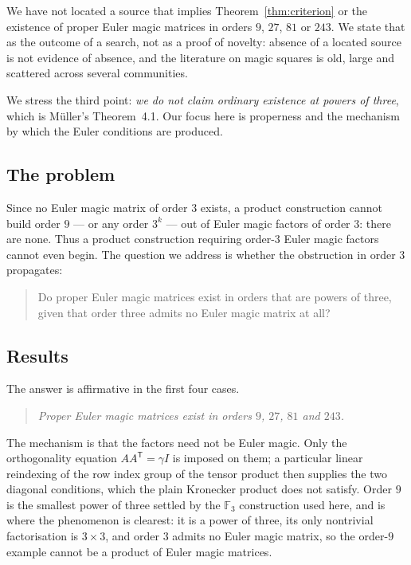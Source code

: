 \documentclass[11pt,a4paper]{amsart}
\theoremstyle{plain}
\theoremstyle{definition}
\theoremstyle{remark}
\newcommand{\FF}{\mathbb{F}}
\newcommand{\tr}{\mathsf{T}}
\begin{document}
We have not located a source that implies Theorem~\ref{thm:criterion} or the
existence of proper Euler magic matrices in orders $9$, $27$, $81$ or $243$. We
state that as the outcome of a search, not as a proof of novelty: absence of a
located source is not evidence of absence, and the literature on magic squares
is old, large and scattered across several communities.

We stress the third point: \emph{we do not claim ordinary existence at powers of
three}, which is Müller's Theorem~4.1. Our focus here is properness and the
mechanism by which the Euler conditions are produced.

\subsection*{The problem}

Since no Euler magic matrix of order $3$ exists, a product construction cannot
build order $9$ --- or any order $3^k$ --- out of Euler magic factors of order
$3$: there are none. Thus a product construction requiring order-$3$ Euler
magic factors cannot even begin. The question we address is whether the
obstruction in order $3$ propagates:

\begin{quote}
Do proper Euler magic matrices exist in orders that are powers of three, given
that order three admits no Euler magic matrix at all?
\end{quote}

\subsection*{Results}

The answer is affirmative in the first four cases.

\begin{quote}
\emph{Proper Euler magic matrices exist in orders $9$, $27$, $81$ and $243$.}
\end{quote}

The mechanism is that the factors need not be Euler magic. Only the
orthogonality equation $AA^{\tr}=\gamma I$ is imposed on them; a particular
linear reindexing of the row index group of the tensor product then supplies
the two diagonal conditions, which the plain Kronecker product does not satisfy.
Order $9$ is the smallest power of three settled by the $\FF_3$ construction used
here, and is where the phenomenon is clearest: it is a power of three, its only
nontrivial factorisation is $3\times3$, and order $3$ admits no Euler magic
matrix, so the order-$9$ example cannot be a product of Euler magic matrices.
\end{document}
